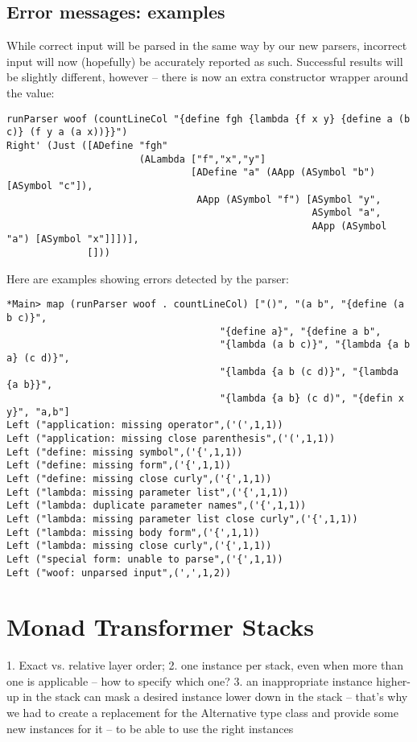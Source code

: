 \documentclass{tmr}
\begin{document}
\subsection{Error messages:  examples}
While correct input will be parsed in the same way by our new parsers, incorrect input will now (hopefully) be
accurately reported as such.  Successful results will be slightly different, however -- there is now an extra
constructor wrapper around the value:
\begin{verbatim}
runParser woof (countLineCol "{define fgh {lambda {f x y} {define a (b c)} (f y a (a x))}}")
Right' (Just ([ADefine "fgh" 
                       (ALambda ["f","x","y"] 
                                [ADefine "a" (AApp (ASymbol "b") [ASymbol "c"]),
                                 AApp (ASymbol "f") [ASymbol "y",
                                                     ASymbol "a",
                                                     AApp (ASymbol "a") [ASymbol "x"]]])],
              []))
\end{verbatim}
Here are examples showing errors detected by the parser:
\begin{verbatim}
*Main> map (runParser woof . countLineCol) ["()", "(a b", "{define (a b c)}",  
                                     "{define a}", "{define a b", 
                                     "{lambda (a b c)}", "{lambda {a b a} (c d)}", 
                                     "{lambda {a b (c d)}", "{lambda {a b}}", 
                                     "{lambda {a b} (c d)", "{defin x y}", "a,b"]
Left ("application: missing operator",('(',1,1))
Left ("application: missing close parenthesis",('(',1,1))
Left ("define: missing symbol",('{',1,1))
Left ("define: missing form",('{',1,1))
Left ("define: missing close curly",('{',1,1))
Left ("lambda: missing parameter list",('{',1,1))
Left ("lambda: duplicate parameter names",('{',1,1))
Left ("lambda: missing parameter list close curly",('{',1,1))
Left ("lambda: missing body form",('{',1,1))
Left ("lambda: missing close curly",('{',1,1))
Left ("special form: unable to parse",('{',1,1))
Left ("woof: unparsed input",(',',1,2))
\end{verbatim}



\section{Monad Transformer Stacks}

1. Exact vs. relative layer order; 
2. one instance per stack, even when more than one is applicable --
how to specify which one?
3. an inappropriate instance higher-up in the stack can mask a 
desired instance lower down in the stack -- that's why we had to
create a replacement for the Alternative type class and provide
some new instances for it -- to be able to use the right instances
\end{document}
